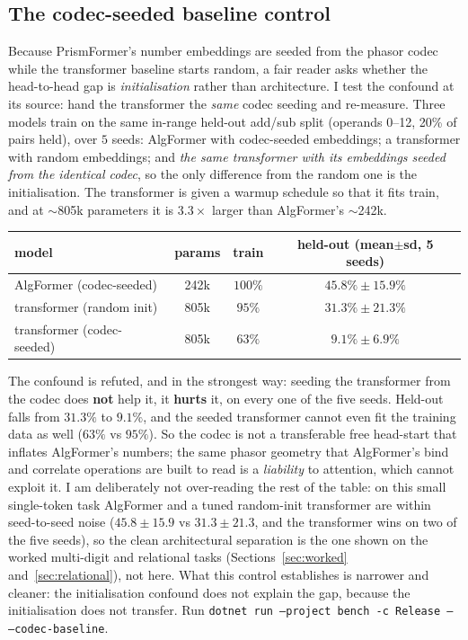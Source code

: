\documentclass[11pt]{article}
\newcommand{\code}[1]{\texttt{#1}}
\begin{document}
\subsection{The codec-seeded baseline control}\label{sec:codecbaseline}

Because PrismFormer's number embeddings are seeded from the phasor codec while the transformer baseline
starts random, a fair reader asks whether the head-to-head gap is \emph{initialisation} rather than
architecture. I test the confound at its source: hand the transformer the \emph{same} codec seeding and
re-measure. Three models train on the same in-range held-out add/sub split (operands 0--12, 20\% of pairs
held), over $5$ seeds: AlgFormer with codec-seeded embeddings; a transformer with random embeddings; and
\emph{the same transformer with its embeddings seeded from the identical codec}, so the only difference
from the random one is the initialisation. The transformer is given a warmup schedule so that it fits
train, and at $\sim$805k parameters it is $3.3\times$ larger than AlgFormer's $\sim$242k.

\begin{center}
\begin{tabular}{@{}lccc@{}}
\toprule
model & params & train & held-out (mean$\pm$sd, 5 seeds) \\
\midrule
AlgFormer (codec-seeded)   & 242k & $100\%$ & $45.8\% \pm 15.9\%$ \\
transformer (random init)  & 805k & $95\%$  & $31.3\% \pm 21.3\%$ \\
transformer (codec-seeded) & 805k & $63\%$  & $\mathbf{9.1\% \pm 6.9\%}$ \\
\bottomrule
\end{tabular}
\end{center}

The confound is refuted, and in the strongest way: seeding the transformer from the codec does
\textbf{not} help it, it \textbf{hurts} it, on every one of the five seeds. Held-out falls from $31.3\%$
to $9.1\%$, and the seeded transformer cannot even fit the training data as well ($63\%$ vs $95\%$). So
the codec is not a transferable free head-start that inflates AlgFormer's numbers; the same phasor
geometry that AlgFormer's bind and correlate operations are built to read is a \emph{liability} to
attention, which cannot exploit it. I am deliberately not over-reading the rest of the table: on this
small single-token task AlgFormer and a tuned random-init transformer are within seed-to-seed noise
($45.8\pm15.9$ vs $31.3\pm21.3$, and the transformer wins on two of the five seeds), so the clean
architectural separation is the one shown on the worked multi-digit and relational tasks
(Sections~\ref{sec:worked} and~\ref{sec:relational}), not here. What this control establishes is narrower
and cleaner: the initialisation confound does not explain the gap, because the initialisation does not
transfer. Run \code{dotnet run --project bench -c Release -- --codec-baseline}.
\end{document}
